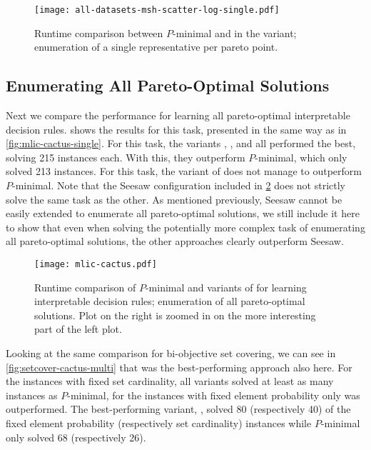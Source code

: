 \begin{figure}
  \centering
  \texttt{[image: all-datasets-msh-scatter-log-single.pdf]}
  \caption{Runtime comparison between $P$-minimal and \algname{} in the \msh{} variant;
    enumeration of a single representative per pareto point.
  }\label{fig:msh-scatter-single}
\end{figure}

\subsection{Enumerating All Pareto-Optimal Solutions}

Next we compare the performance for learning all pareto-optimal interpretable decision rules.
 shows the results for this task, presented in the same way as in \cref{fig:mlic-cactus-single}.
For this task, the \algname{} variants \satunsat{}, \unsatsat{}, \msu{} and \msh{} all performed the best, solving 215 instances each.
With this, they outperform $P$-minimal, which only solved 213 instances.
For this task, the \oll{} variant of \algname{} does not manage to outperform $P$-minimal.
Note that the Seesaw configuration included in \cref{fig:mlic-cactus-multi} does not strictly solve the same task as the other.
As mentioned previously, Seesaw cannot be easily extended to enumerate all pareto-optimal solutions, we still include it here to show that even when solving the potentially more complex task of enumerating all pareto-optimal solutions, the other approaches clearly outperform Seesaw.

\begin{figure}
  \centering
  \texttt{[image: mlic-cactus.pdf]}
  \caption{Runtime comparison of  $P$-minimal and variants of \algname{} for learning interpretable decision rules;
    enumeration of all pareto-optimal solutions.
    Plot on the right is zoomed in on the more interesting part of the left plot.
  }\label{fig:mlic-cactus-multi}
\end{figure}

Looking at the same comparison for bi-objective set covering, we can see in \cref{fig:setcover-cactus-multi} that \msh{} was the best-performing approach also here.
For the instances with fixed set cardinality, all \algname{} variants solved at least as many instances as $P$-minimal, for the instances with fixed element probability only \oll{} was outperformed.
The best-performing variant, \msh{}, solved 80 (respectively 40) of the fixed element probability (respectively set cardinality) instances while $P$-minimal only solved 68 (respectively 26).

